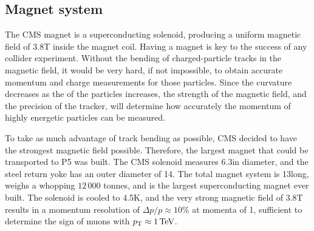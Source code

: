 
\subsection{Magnet system \label{sec:cms_magnet}}

The CMS magnet is a superconducting solenoid, producing a uniform magnetic field of 3.8\unit{T}
inside the magnet coil. 
Having a magnet is key to the success of any collider experiment. Without the bending of
charged-particle tracks in the magnetic field, it would be very hard, if not impossible, to obtain
accurate momentum and charge measurements for those particles. 
Since the curvature decreases as the \pt of the particles increases, the strength of the magnetic
field, and the precision of the tracker, will determine how accurately the momentum of highly
energetic particles can be measured. 

To take as much advantage of track bending as possible, CMS decided to have the strongest magnetic
field possible. Therefore, the largest magnet that could be transported to P5 was built. The CMS
solenoid measures 6.3\meter in diameter, and the steel return yoke has an outer diameter of
14\meter. The total magnet system is 13\meter long, weighs a whopping $12\,000$ tonnes,
and is the largest superconducting magnet ever built. The solenoid is cooled to 4.5\unit{K}, and the
very strong magnetic field of 3.8\unit{T} results in a momentum resolution of $\Delta p / p \approx
10\%$ at momenta of 1\TeV, sufficient to determine the sign of muons with $p_{\mathrm{T}} \approx 1 \,\text{Te\hspace{-.08em}V}$. 

